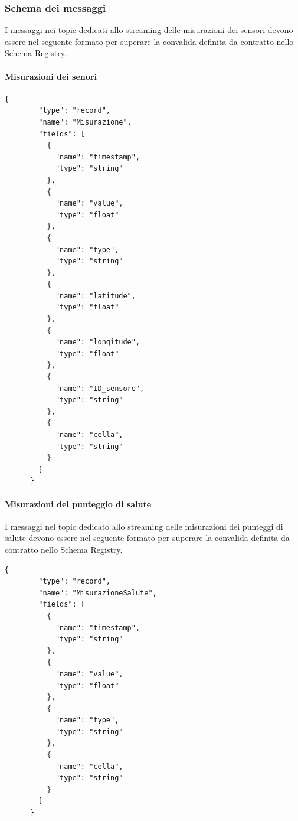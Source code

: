 \subsubsection{Schema dei messaggi}\label{sec:schema_registry_sez_schema}
I messaggi nei topic dedicati allo streaming delle misurazioni dei sensori devono essere nel seguente formato per superare la convalida definita da contratto nello Schema Registry.

\paragraph{Misurazioni dei senori}
\begin{lstlisting}[style=code]
    {
        "type": "record",
        "name": "Misurazione",
        "fields": [
          {
            "name": "timestamp",
            "type": "string"
          },
          {
            "name": "value",
            "type": "float"
          },
          {
            "name": "type",
            "type": "string"
          },
          {
            "name": "latitude",
            "type": "float"
          },
          {
            "name": "longitude",
            "type": "float"
          },
          {
            "name": "ID_sensore",
            "type": "string"
          },
          {
            "name": "cella",
            "type": "string"
          }
        ]
      }
\end{lstlisting}

\paragraph{Misurazioni del punteggio di salute}
I messaggi nel topic dedicato allo streaming delle misurazioni dei punteggi di salute devono essere nel seguente formato per superare la convalida definita da contratto nello Schema Registry.
\begin{lstlisting}[style=code]
    {
        "type": "record",
        "name": "MisurazioneSalute",
        "fields": [
          {
            "name": "timestamp",
            "type": "string"
          },
          {
            "name": "value",
            "type": "float"
          },
          {
            "name": "type",
            "type": "string"
          },
          {
            "name": "cella",
            "type": "string"
          }
        ]
      }
    \end{lstlisting}
